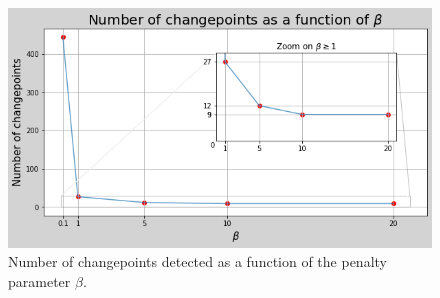 \documentclass[11pt]{article}
\begin{document}
\begin{figure}[H]
    \centering
    \begin{minipage}[t]{0.52\textwidth}
        \includegraphics[width=\textwidth]{figures/results/cgpts_beta.png}
        \caption{Number of changepoints detected as a function of the penalty parameter $\beta$.}
        \label{fig:cgpts_beta}
    \end{minipage}
\end{figure}
\end{document}

